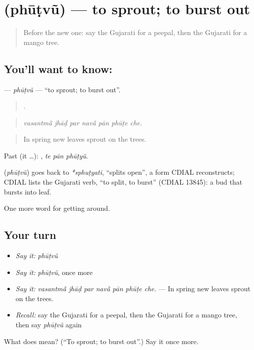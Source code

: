 \section[\texorpdfstring{\gu{ફૂટવું} (phūṭvũ)}{ફૂટવું (phūṭvũ)}]{ (phūṭvũ) — to sprout; to burst out}

\label{lesson:GU-C443-phutvu}



\begin{quote}
Before the new one: say the Gujarati for a peepal, then the Gujarati for a mango tree.
\end{quote}

\subsection*{You'll want to know: }
\textbf{} — \emph{phūṭvũ} — \textquotedblleft{}to sprout; to burst out\textquotedblright{}.

\begin{quote}
      .
\end{quote}

\begin{quote}
\emph{vasantmā̃ jhāḍ par navā̃ pān phūṭe che.}
\end{quote}

\begin{quote}
In spring new leaves sprout on the trees.
\end{quote}

Past (it …):   , \emph{te pān phūṭyũ}.

\begin{cousinweb}
\textbf{} (\emph{phūṭvũ}) goes back to \emph{*sphuṭyati}, \textquotedblleft{}splits open\textquotedblright{}, a form CDIAL reconstructs; CDIAL lists the Gujarati verb, \textquotedblleft{}to split, to burst\textquotedblright{} (CDIAL 13845): a bud that bursts into leaf.
\end{cousinweb}

\begin{grammarlens}[title={What you've built}]
One more word for getting around.
\end{grammarlens}

\subsection*{Your turn}
\begin{itemize}
\raggedright
  \item \emph{Say it:} \emph{phūṭvũ}
  \item \emph{Say it:} \emph{phūṭvũ}, once more
  \item \emph{Say it:} \emph{vasantmā̃ jhāḍ par navā̃ pān phūṭe che.} — In spring new leaves sprout on the trees.
  \item \emph{Recall:} say the Gujarati for a peepal, then the Gujarati for a mango tree, then say \emph{phūṭvũ} again
\end{itemize}

\begin{tcolorbox}[breakable,colback=teal!4,colframe=teal!35!black,title={Before you move on}]
What does  mean? (\textquotedblleft{}To sprout; to burst out\textquotedblright{}.) Say it once more.
\end{tcolorbox}
